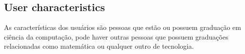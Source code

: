 \subsection{User characteristics}
As características dos usuários são pessoas que estão ou possuem graduação em ciência da computação, pode haver outras pessoas que possuem graduações relacionadas como matemática ou qualquer outro de tecnologia.

